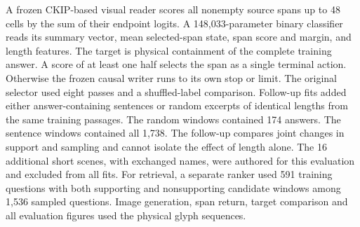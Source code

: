 A frozen CKIP-based visual reader scores all nonempty source spans up to 48 cells by the sum of their endpoint logits. A 148,033-parameter binary classifier reads its summary vector, mean selected-span state, span score and margin, and length features. The target is physical containment of the complete training answer. A score of at least one half selects the span as a single terminal action. Otherwise the frozen causal writer runs to its own stop or limit. The original selector used eight passes and a shuffled-label comparison. Follow-up fits added either answer-containing sentences or random excerpts of identical lengths from the same training passages. The random windows contained 174 answers. The sentence windows contained all 1,738. The follow-up compares joint changes in support and sampling and cannot isolate the effect of length alone. The 16 additional short scenes, with exchanged names, were authored for this evaluation and excluded from all fits. For retrieval, a separate ranker used 591 training questions with both supporting and nonsupporting candidate windows among 1,536 sampled questions. Image generation, span return, target comparison and all evaluation figures used the physical glyph sequences.
